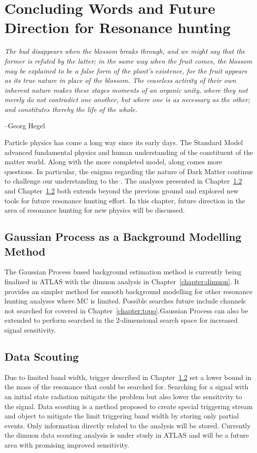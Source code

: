 \chapter{Concluding Words and Future Direction for Resonance hunting}


\epigraph{\textit{The bud disappears when the blossom breaks through, and we might say that the former is refuted by the latter; in the same way when the fruit comes, the blossom may be explained to be a false form of the plant’s existence, for the fruit appears as its true nature in place of the blossom. The ceaseless activity of their own inherent nature makes these stages moments of an organic unity, where they not merely do not contradict one another, but where one is as necessary as the other; and constitutes thereby the life of the whole.}}{--Georg Hegel}

Particle physics has come a long way since its early days. The Standard Model advanced fundamental physics and human understanding of the constituent of the matter world. Along with the more completed model, along comes more questions. In particular, the enigma regarding the nature of Dark Matter continue to challenge our understanding to the . The analyses presented in Chapter~\ref{} and Chapter~\ref{} both extends beyond the previous ground and explored new tools for future resonance hunting effort. In this chapter, future direction in the area of resonance hunting for new physics will be discussed.




\section{Gaussian Process as a Background Modelling Method}
The Gaussian Process based background estimation method is currently being finalized in ATLAS with the dimuon analysis in Chapter~\ref{chapter:dimuon}. It provides an simpler method for smooth background modelling for other resonance hunting analyses where MC is limited. Possible searches future include channels not searched for covered in Chapter~\ref{chapter:topo}.Gaussian Process can also be extended to perform searched in the 2-dimensional search space for increased signal sensitivity.

\section{Data Scouting}
Due to limited band width, trigger described in Chapter~\ref{} set a lower bound in the mass of the resonance that could be searched for. Searching for a signal with an initial state radiation mitigate the problem but also lower the sensitivity to the signal. Data scouting is a method proposed to create special triggering stream and object to mitigate the limit triggering band width by storing only partial events. Only information directly related to the analysis will be stored. Currently the
dimuon data scouting analysis is under study in ATLAS and will be a future area with promising improved sensitivity. 

